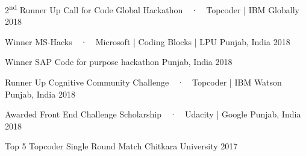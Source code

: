 
\vspace{-0.3cm}



\begin{cvhonors}


  \cvhonor
  {2\textsuperscript{nd} Runner Up} %
  {Call for Code Global Hackathon~~·~~Topcoder | IBM} %
  {Globally} %
  {2018} %

  \cvhonor
  {Winner}
  {MS-Hacks~~·~~Microsoft | Coding Blocks | LPU}
  {Punjab, India}
  {2018}


  \cvhonor
  {Winner} %
  {SAP Code for purpose hackathon} %
  {Punjab, India} %
  {2018} %


  \cvhonor
  {Runner Up} %
  {Cognitive Community Challenge~~·~~Topcoder | IBM Watson} %
  {Punjab, India} %
  {2018} %


  \cvhonor
  {Awarded} %
  {Front End Challenge Scholarship~~·~~Udacity | Google} %
  {Punjab, India} %
  {2018} %


  \cvhonor
  {Top 5} %
  {Topcoder Single Round Match} %
  {Chitkara University} %
  {2017} %


\end{cvhonors}

